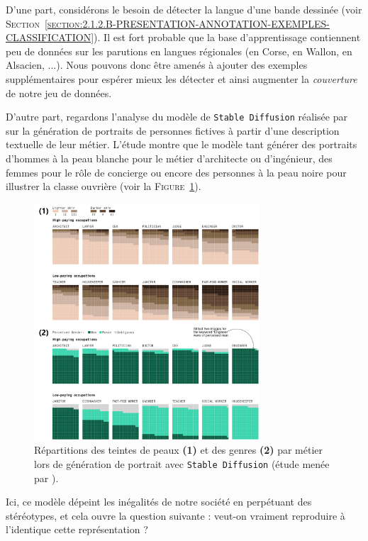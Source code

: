 			\begin{leftBarExamples}
				D'une part, considérons le besoin de détecter la langue d'une bande dessinée (voir \textsc{Section~\ref{section:2.1.2.B-PRESENTATION-ANNOTATION-EXEMPLES-CLASSIFICATION}}).
				Il est fort probable que la base d'apprentissage contiennent peu de données sur les parutions en langues régionales (en Corse, en Wallon, en Alsacien, ...).
				Nous pouvons donc être amenés à ajouter des exemples supplémentaires pour espérer mieux les détecter et ainsi augmenter la \textit{couverture} de notre jeu de données.
				
				D'autre part, regardons l'analyse du modèle de \texttt{Stable Diffusion} réalisée par \cite{nicoletti-bass:2023:generative-ai-takes} sur la génération de portraits de personnes fictives à partir d'une description textuelle de leur métier.
				L'étude montre que le modèle tant générer des portraits d'hommes à la peau blanche pour le métier d'architecte ou d'ingénieur, des femmes pour le rôle de concierge ou encore des personnes à la peau noire pour illustrer la classe ouvrière (voir la \textsc{Figure~\ref{figure:2.3.1.A-DEFIS-ANNOTATION-ASPECT-DONNEES-REPRESENTATIVITE-STEREOTYPES}}).
				\begin{figure}[H]
					\centering
					\includegraphics[width=0.75\textwidth]{figures/etatdelart-nicoletti-bass-2023}
					\caption{
						Répartitions des teintes de peaux \textbf{(1)} et des genres \textbf{(2)} par métier lors de génération de portrait avec \texttt{Stable Diffusion} (étude menée par \cite{nicoletti-bass:2023:generative-ai-takes}).
					}
					\label{figure:2.3.1.A-DEFIS-ANNOTATION-ASPECT-DONNEES-REPRESENTATIVITE-STEREOTYPES}
				\end{figure}
				Ici, ce modèle dépeint les inégalités de notre société en perpétuant des stéréotypes, et cela ouvre la question suivante : veut-on vraiment reproduire à l'identique cette représentation ?
			\end{leftBarExamples}
